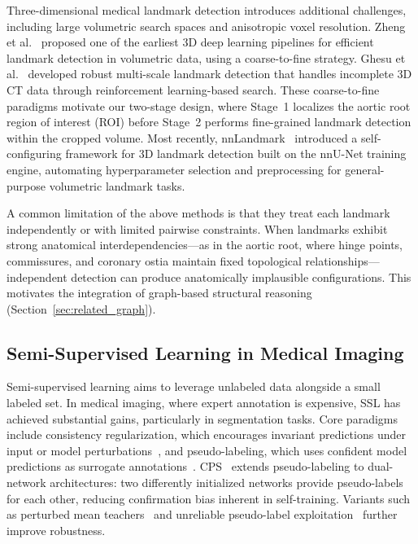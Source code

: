 \documentclass[conference]{IEEEtran}
\begin{document}
Three-dimensional medical landmark detection introduces additional challenges, including large volumetric search spaces and anisotropic voxel resolution. Zheng et al.~\cite{Zheng2015_3d_landmark} proposed one of the earliest 3D deep learning pipelines for efficient landmark detection in volumetric data, using a coarse-to-fine strategy. Ghesu et al.~\cite{Ghesu2017_multiscale_landmark} developed robust multi-scale landmark detection that handles incomplete 3D CT data through reinforcement learning-based search. These coarse-to-fine paradigms motivate our two-stage design, where Stage~1 localizes the aortic root region of interest (ROI) before Stage~2 performs fine-grained landmark detection within the cropped volume. Most recently, nnLandmark~\cite{nnLandmark2025} introduced a self-configuring framework for 3D landmark detection built on the nnU-Net training engine, automating hyperparameter selection and preprocessing for general-purpose volumetric landmark tasks.

A common limitation of the above methods is that they treat each landmark independently or with limited pairwise constraints. When landmarks exhibit strong anatomical interdependencies---as in the aortic root, where hinge points, commissures, and coronary ostia maintain fixed topological relationships---independent detection can produce anatomically implausible configurations. This motivates the integration of graph-based structural reasoning (Section~\ref{sec:related_graph}).

\subsection{Semi-Supervised Learning in Medical Imaging}

Semi-supervised learning aims to leverage unlabeled data alongside a small labeled set. In medical imaging, where expert annotation is expensive, SSL has achieved substantial gains, particularly in segmentation tasks. Core paradigms include consistency regularization, which encourages invariant predictions under input or model perturbations~\cite{Laine2017_temporal_ensembling,Tarvainen2017_mean_teacher}, and pseudo-labeling, which uses confident model predictions as surrogate annotations~\cite{Sohn2020_fixmatch}. CPS~\cite{Chen2021_cps} extends pseudo-labeling to dual-network architectures: two differently initialized networks provide pseudo-labels for each other, reducing confirmation bias inherent in self-training. Variants such as perturbed mean teachers~\cite{Liu2022_perturbed_mean_teacher} and unreliable pseudo-label exploitation~\cite{Wang2022_u2pl} further improve robustness.
\end{document}
